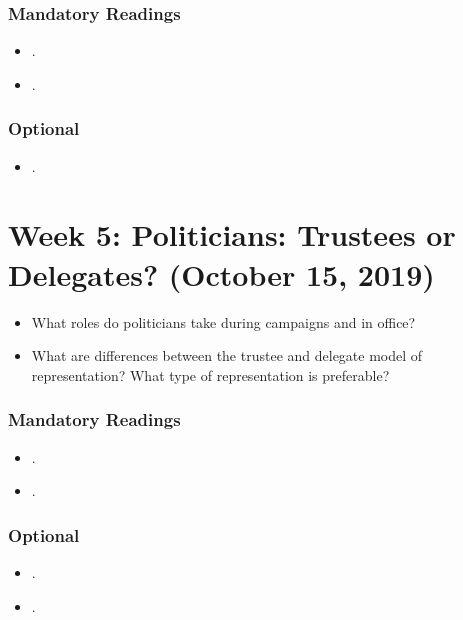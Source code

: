 \documentclass[abstract=on,parskip=full,headings=standardclasses,fontsize=11pt,paper=a4]{scrartcl}
\begin{document}
\subsubsection*{Mandatory Readings}
\begin{itemize}
\item {}.
\item {}.
\end{itemize}


\subsubsection*{Optional}
\begin{itemize}
\item {}.
\end{itemize}


\section{Week 5: Politicians: Trustees or Delegates? (October 15, 2019)}


\begin{itemize}
\renewcommand\labelitemi{--}
\item What roles do politicians take during campaigns and in office? 
\item What are differences between the trustee and delegate model of representation? What type of representation is preferable?
\end{itemize}


\subsubsection*{Mandatory Readings}
\begin{itemize}
\item {}.
\item {}.
\end{itemize}


\subsubsection*{Optional}
\begin{itemize}
\item {}.
\item {}.
\end{itemize}
\end{document}
